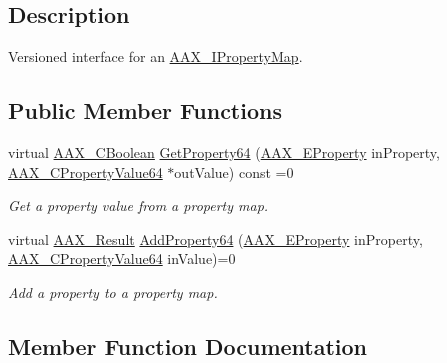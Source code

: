 \subsection{Description}
Versioned interface for an \mbox{\hyperlink{a01869}{A\+A\+X\+\_\+\+I\+Property\+Map}}. \subsection*{Public Member Functions}
\begin{DoxyCompactItemize}
\item 
virtual \mbox{\hyperlink{a00392_aa216506530f1d19a2965931ced2b274b}{A\+A\+X\+\_\+\+C\+Boolean}} \mbox{\hyperlink{a01753_a50631b0da6247499c8758e3508ea33a4}{Get\+Property64}} (\mbox{\hyperlink{a00662_a13e384f22825afd3db6d68395b79ce0d}{A\+A\+X\+\_\+\+E\+Property}} in\+Property, \mbox{\hyperlink{a00392_a49471789032304f99ac1af8c15a87313}{A\+A\+X\+\_\+\+C\+Property\+Value64}} $\ast$out\+Value) const =0
\begin{DoxyCompactList}\small\item\em Get a property value from a property map. \end{DoxyCompactList}\item 
virtual \mbox{\hyperlink{a00392_a4d8f69a697df7f70c3a8e9b8ee130d2f}{A\+A\+X\+\_\+\+Result}} \mbox{\hyperlink{a01753_acbce1075d81361b9ac8a10a9f133949f}{Add\+Property64}} (\mbox{\hyperlink{a00662_a13e384f22825afd3db6d68395b79ce0d}{A\+A\+X\+\_\+\+E\+Property}} in\+Property, \mbox{\hyperlink{a00392_a49471789032304f99ac1af8c15a87313}{A\+A\+X\+\_\+\+C\+Property\+Value64}} in\+Value)=0
\begin{DoxyCompactList}\small\item\em Add a property to a property map. \end{DoxyCompactList}\end{DoxyCompactItemize}


\subsection{Member Function Documentation}
\mbox{\label{a01753_a50631b0da6247499c8758e3508ea33a4}} 
